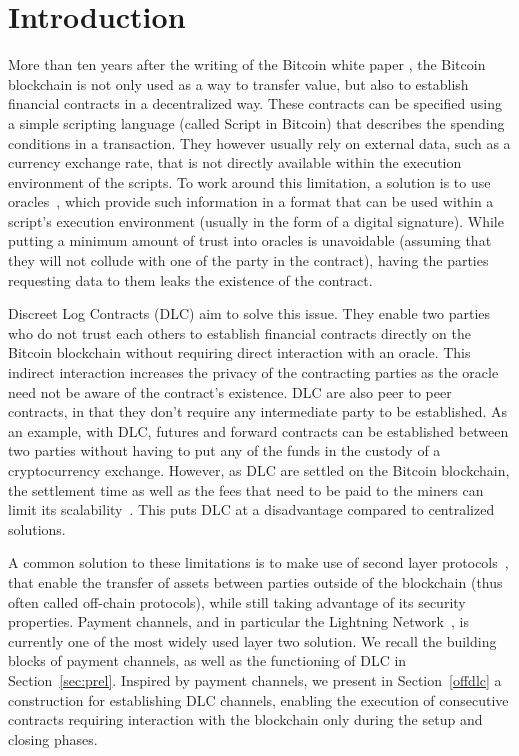 \section{Introduction}
More than ten years after the writing of the Bitcoin white paper \cite{nakamoto2009bitcoin}, the Bitcoin blockchain is not only used as a way to transfer value, but also to establish financial contracts in a decentralized way.
These contracts can be specified using a simple scripting language (called Script in Bitcoin) that describes the spending conditions in a transaction.
They however usually rely on external data, such as a currency exchange rate, that is not directly available within the execution environment of the scripts.
To work around this limitation, a solution is to use oracles~\cite{ellis2017chainlink}, which provide such information in a format that can be used within a script's execution environment (usually in the form of a digital signature).
While putting a minimum amount of trust into oracles is unavoidable (assuming that they will not collude with one of the party in the contract), having the parties requesting data to them leaks the existence of the contract.

Discreet Log Contracts (DLC) \cite{dryja2017discreet} aim to solve this issue.
They enable two parties who do not trust each others to establish financial contracts directly on the Bitcoin blockchain without requiring direct interaction with an oracle.
This indirect interaction increases the privacy of the contracting parties as the oracle need not be aware of the contract’s existence.
DLC are also peer to peer contracts, in that they don't require any intermediate party to be established.
As an example, with DLC, futures and forward contracts can be established between two parties without having to put any of the funds in the custody of a cryptocurrency exchange.
However, as DLC are settled  on the Bitcoin blockchain, the settlement time as well as the fees that need to be paid to the miners can limit its scalability~\cite{decker2016scalability}. 
This puts DLC at a disadvantage compared to centralized solutions.

A common solution to these limitations is to make use of second layer protocols~\cite{gudgeon2020sok}, that enable the transfer of assets between parties outside of the blockchain (thus often called off-chain protocols), while still taking advantage of its security properties. 
Payment channels, and in particular the Lightning Network~\cite{poon2016bitcoin}, is currently one of the most widely used layer two solution.
We recall the building blocks of payment channels, as well as the functioning of DLC in Section~\ref{sec:prel}.
Inspired by payment channels, we present in Section~\ref{offdlc} a construction for establishing DLC channels, enabling the execution of consecutive contracts requiring interaction with the blockchain only during the setup and closing phases.

